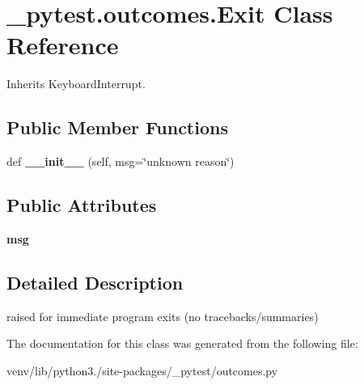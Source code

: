 \hypertarget{class__pytest_1_1outcomes_1_1_exit}{}\section{\+\_\+pytest.\+outcomes.\+Exit Class Reference}
\label{class__pytest_1_1outcomes_1_1_exit}


Inherits Keyboard\+Interrupt.

\subsection*{Public Member Functions}
\begin{DoxyCompactItemize}
\item 
\mbox{\label{class__pytest_1_1outcomes_1_1_exit_ab69246d8981620ab70b4c51e16994644}} 
def {\bfseries \+\_\+\+\_\+init\+\_\+\+\_\+} (self, msg=\char`\"{}unknown reason\char`\"{})
\end{DoxyCompactItemize}
\subsection*{Public Attributes}
\begin{DoxyCompactItemize}
\item 
\mbox{\label{class__pytest_1_1outcomes_1_1_exit_a4f424e71cc94cc98d985888b43db773a}} 
{\bfseries msg}
\end{DoxyCompactItemize}


\subsection{Detailed Description}
\begin{DoxyVerb}raised for immediate program exits (no tracebacks/summaries)\end{DoxyVerb}
 

The documentation for this class was generated from the following file\+:\begin{DoxyCompactItemize}
\item 
venv/lib/python3./site-\/packages/\+\_\+pytest/outcomes.\+py\end{DoxyCompactItemize}
